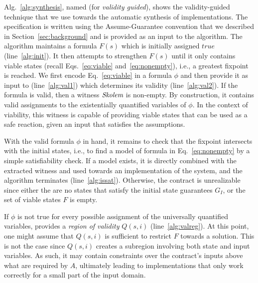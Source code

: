 Alg.~\ref{alg:synthesis}, named \jsynvg (for {\em validity guided}), shows the validity-guided technique that we use towards the automatic synthesis of implementations. The specification is written using the Assume-Guarantee convention that we described in Section~\ref{sec:background} and is provided as an input to the algorithm.
The algorithm maintains a formula $F(s)$ which is initially assigned $\mathit{true}$ (line~\ref{alg:init}).
It then attempts to strengthen $F(s)$ until it only contains viable states (recall Eqs.~\ref{eq:viable}
and~\ref{eq:nonempty}), i.e., a greatest fixpoint is reached.
We first encode Eq.~\ref{eq:viable} in a formula $\phi$ and then provide it as input to \aeval (line~\ref{alg:val1}) which determines its validity (line~\ref{alg:val2}).
If the formula is valid, then a witness $\textit{Skolem}$ is non-empty.
By construction, it contains valid assignments to the existentially quantified variables of $\phi$.
In the context of viability, this witness is capable of providing viable states that can be used as a safe
reaction, given an input that satisfies the assumptions.

With the valid formula $\phi$ in hand, it remains to check that the fixpoint intersects with the initial states, i.e., to find a model of formula in Eq.~\ref{eq:nonempty} by a simple satisfiability check.
If a model exists, it is directly combined with the extracted witness and used towards an implementation of the system, and the algorithm terminates (line~\ref{alg:issat}).
Otherwise, the contract is unrealizable since either the are no states that satisfy the
initial state guarantees $G_I$, or the set of viable states $F$ is empty.


If $\phi$ is not true for every possible assignment of the universally
quantified variables, \aeval provides a \textit{region of validity} $Q(s,i)$
(line~\ref{alg:valreg}).
At this point, one might assume that $Q(s,i)$ is sufficient to restrict $F$ towards a solution. This is not the case since $Q(s,i)$ creates a subregion
involving both state and input variables. As such, it may contain constraints
over the contract's inputs above what are required by $A$, ultimately leading to implementations that only work correctly for a small part of the input domain.

